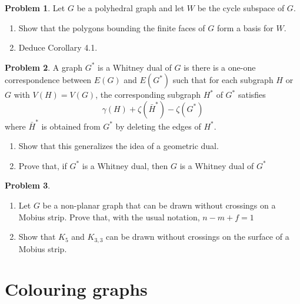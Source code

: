 \documentclass[a4paper,11pt]{article}%
\theoremstyle{remark}
\theoremstyle{definition}
\newtheorem{problem}{Problem}[subsection]
\begin{document}
\begin{problem}
    Let $G$ be a polyhedral graph and let $W$ be the cycle subspace of $G$.
    \begin{enumerate}
        \item Show that the polygons bounding the finite faces of $G$ form a basis for $W$.
        \item Deduce Corollary 4.1.
    \end{enumerate}
\end{problem}
\begin{problem}
    A graph $G^*$ is a Whitney dual of $G$ is there is a one-one correspondence between $E(G)$ and $E(G^*)$ such that for each subgraph $H$
    or $G$ with $V(H)=V(G)$, the corresponding subgraph $H^*$ of $G^*$ satisfies 
    \[\gamma(H)+\zeta(\bar{H}^*)-\zeta(G^*)\]
    where $\bar{H}^*$ is obtained from $G^*$ by deleting the edges of $H^*$.
    \begin{enumerate}
        \item Show that this generalizes the idea of a geometric dual.
        \item Prove that, if $G^*$ is a Whitney dual, then $G$ is a Whitney dual of $G^*$
    \end{enumerate} 
\end{problem}
\begin{problem}
    \begin{enumerate}
        \item Let $G$ be a non-planar graph that can be drawn without crossings on a Mobius strip. Prove that, with the usual notation, $n-m+f=1$
        \item Show that $K_5$ and $K_{3,3}$ can be drawn without crossings on the surface of a Mobius strip.
    \end{enumerate}
\end{problem}
\section{Colouring graphs}
\end{document}
